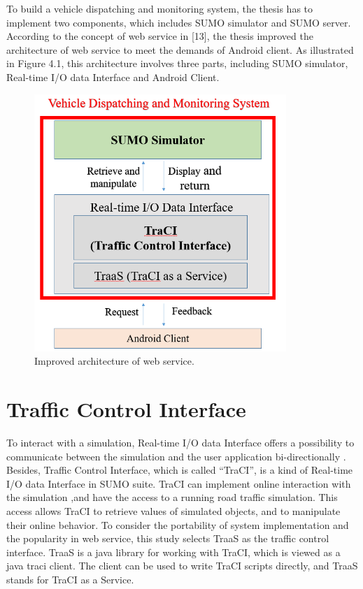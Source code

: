 \documentclass[12pt]{ksthesis}
\begin{document}
\begin{thesis}
{To build a vehicle dispatching and monitoring system, the thesis has to implement two components, which includes SUMO simulator and SUMO server. According to the concept of web service in [13], the thesis improved the architecture of web service to meet the demands of Android client.
As illustrated in Figure 4.1, this architecture involves three parts, including SUMO simulator, Real-time I/O data Interface and Android Client.

\begin{figure}[t!]
\centering
\includegraphics[width=0.85\textwidth]{./Thesis_figures/F4-1_webService_arcitecture.PNG}
\caption{\large Improved architecture of web service.}
\vspace{0.5cm}
\label{Fig:Improved_architecture_of_web_service}
\end{figure}



\section{Traffic Control Interface}
To interact with a simulation, Real-time I/O data Interface offers a possibility to communicate between the simulation and the user application bi-directionally \cite{Fischer}. Besides, Traffic Control Interface, which is called “TraCI”, is a kind of Real-time I/O data Interface in SUMO suite.
TraCI can implement online interaction with the simulation ,and have the access to a running road traffic simulation. This access allows TraCI to retrieve values of simulated objects, and to manipulate their online behavior.
To consider the portability of system implementation and the popularity in web service, this study selects TraaS as the traffic control interface. TraaS is a java library for working with TraCI, which is viewed as a java traci client. The client can be used to write TraCI scripts directly, and TraaS stands for TraCI as a Service.

}
\end{thesis}
\end{document}
